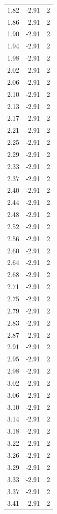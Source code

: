\begin{longtable}{lrr}
  1.82 & -2.91 & 2 \\
  1.86 & -2.91 & 2 \\
  1.90 & -2.91 & 2 \\
  1.94 & -2.91 & 2 \\
  1.98 & -2.91 & 2 \\
  2.02 & -2.91 & 2 \\
  2.06 & -2.91 & 2 \\
  2.10 & -2.91 & 2 \\
  2.13 & -2.91 & 2 \\
  2.17 & -2.91 & 2 \\
  2.21 & -2.91 & 2 \\
  2.25 & -2.91 & 2 \\
  2.29 & -2.91 & 2 \\
  2.33 & -2.91 & 2 \\
  2.37 & -2.91 & 2 \\
  2.40 & -2.91 & 2 \\
  2.44 & -2.91 & 2 \\
  2.48 & -2.91 & 2 \\
  2.52 & -2.91 & 2 \\
  2.56 & -2.91 & 2 \\
  2.60 & -2.91 & 2 \\
  2.64 & -2.91 & 2 \\
  2.68 & -2.91 & 2 \\
  2.71 & -2.91 & 2 \\
  2.75 & -2.91 & 2 \\
  2.79 & -2.91 & 2 \\
  2.83 & -2.91 & 2 \\
  2.87 & -2.91 & 2 \\
  2.91 & -2.91 & 2 \\
  2.95 & -2.91 & 2 \\
  2.98 & -2.91 & 2 \\
  3.02 & -2.91 & 2 \\
  3.06 & -2.91 & 2 \\
  3.10 & -2.91 & 2 \\
  3.14 & -2.91 & 2 \\
  3.18 & -2.91 & 2 \\
  3.22 & -2.91 & 2 \\
  3.26 & -2.91 & 2 \\
  3.29 & -2.91 & 2 \\
  3.33 & -2.91 & 2 \\
  3.37 & -2.91 & 2 \\
  3.41 & -2.91 & 2 \\

\end{longtable}
